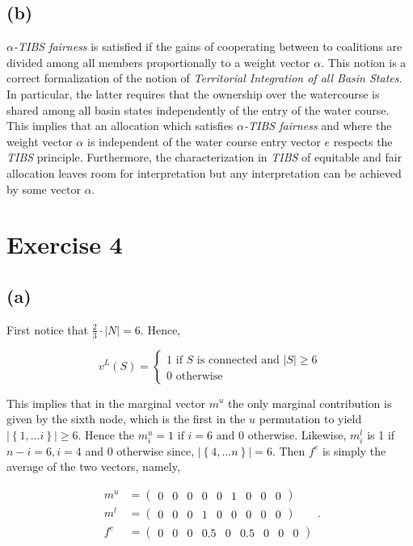 \documentclass[american]{scrartcl}
\newcommand{\set}[1]{\left\{#1\right\}}
\newcommand{\abs}[1]{\left\lvert #1 \right\rvert}
\begin{document}
\subsection*{(b)}

$\alpha$\textit{-TIBS fairness} is satisfied if the gains of cooperating between to coalitions are divided among all members proportionally to a weight vector $\alpha$. This notion is a correct formalization of the notion of \textit{Territorial Integration of all Basin States}. In particular, the latter requires that the ownership over the watercourse is shared among all basin states independently of the entry of the water course. This implies that an allocation which satisfies $\alpha$\textit{-TIBS fairness} and where the weight vector $\alpha$ is independent of the water course entry vector $e$ respects the \textit{TIBS} principle. Furthermore, the characterization in \textit{TIBS} of equitable and fair allocation leaves room for interpretation but any interpretation can be achieved by some vector $\alpha$.



\section*{Exercise 4}

\subsection*{(a)}

First notice that $\frac{2}{3} \cdot \abs{N} = 6$. Hence,

\begin{equation}
    v^L(S) = \begin{cases}
        1  \text{ if $S$ is connected and } \abs{S} \geq 6 \\
        0 \text{ otherwise }
    \end{cases}
\end{equation}


This implies that in the marginal vector $m^u$ the only marginal contribution is given by the sixth node, which is the first in the $u$ permutation to yield $\abs{\set{1, \dots i}} \geq 6$. Hence the $m^u_i = 1 \text{ if } i = 6 \text{ and } 0$ otherwise. Likewise, $m^l_i$ is 1 if $n - i = 6, i = 4$ and $0$ otherwise since, $\abs{\set{4, \dots n}} = 6$. Then $f^e$ is simply the average of the two vectors, namely,

\begin{equation}
    \begin{split}
        m^u &= \begin{pmatrix} 0 &0 &0 &0 &0 &1 &0 &0 &0 \end{pmatrix} \\
        m^l &= \begin{pmatrix} 0 &0 &0 &1 &0 &0 &0 &0 &0 \end{pmatrix} \\
        f^e &= \begin{pmatrix} 0 &0 &0 &0.5 &0 &0.5 &0 &0 &0 \end{pmatrix}
    \end{split}.
\end{equation}
\end{document}
